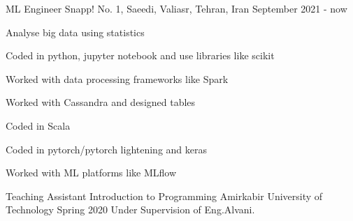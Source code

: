 \begin{cventries}
  \cventry
    {ML Engineer} %
    {Snapp!} %
    {No. 1, Saeedi, Valiasr, Tehran, Iran} %
    {September 2021 - now} %
    {
      \begin{cvitems} %
        \item {Analyse big data using statistics}
        \item {Coded in python, jupyter notebook and use libraries like scikit}
        \item {Worked with data processing frameworks like Spark}
        \item {Worked with Cassandra and designed tables}
        \item {Coded in Scala}
        \item {Coded in pytorch/pytorch lightening and keras}
        \item {Worked with ML platforms like MLflow}
      \end{cvitems}
    }

\end{cventries}



\begin{cventries}

  \cventry
    {Teaching Assistant} %
    {Introduction to Programming} %
    {Amirkabir University of Technology} %
    {Spring 2020} %
    {Under Supervision of Eng.Alvani.}


\end{cventries}

